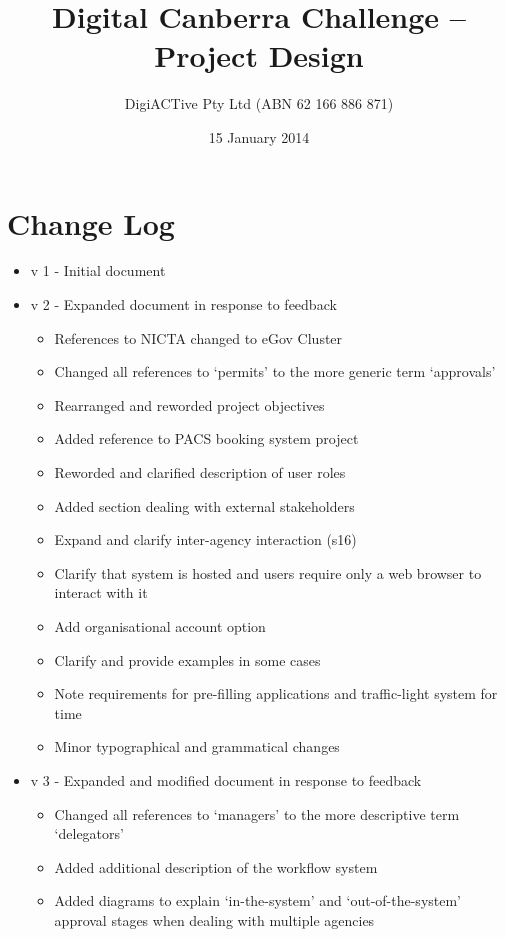 \documentclass[12pt,a4paper,twosided]{article}
\title{Digital Canberra Challenge -- Project Design}
\author{DigiACTive Pty Ltd (ABN 62 166 886 871)}
\date{15 January 2014}
\begin{document}
\maketitle
\section{Change Log}\label{change-log}

\begin{itemize}
\itemsep1pt\parskip0pt
\item
  v 1 - Initial document
\item
  v 2 - Expanded document in response to feedback

  \begin{itemize}
  \itemsep1pt\parskip0pt
  \item
    References to NICTA changed to eGov Cluster
  \item
    Changed all references to `permits' to the more generic term
    `approvals'
  \item
    Rearranged and reworded project objectives
  \item
    Added reference to PACS booking system project
  \item
    Reworded and clarified description of user roles
  \item
    Added section dealing with external stakeholders
  \item
    Expand and clarify inter-agency interaction (s16)
  \item
    Clarify that system is hosted and users require only a web browser
    to interact with it
  \item
    Add organisational account option
  \item
    Clarify and provide examples in some cases
  \item
    Note requirements for pre-filling applications and traffic-light
    system for time
  \item
    Minor typographical and grammatical changes
  \end{itemize}
\item
  v 3 - Expanded and modified document in response to feedback

  \begin{itemize}
  \itemsep1pt\parskip0pt
  \item
    Changed all references to `managers' to the more descriptive term
    `delegators'
  \item
    Added additional description of the workflow system
  \item
    Added diagrams to explain `in-the-system' and `out-of-the-system'
    approval stages when dealing with multiple agencies
  \end{itemize}
\end{itemize}
\end{document}

